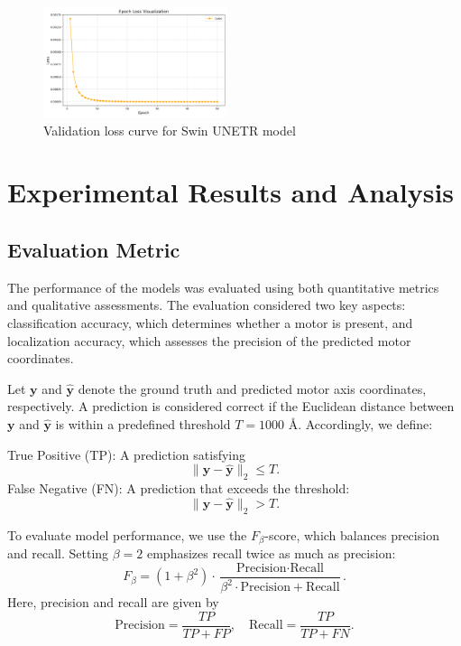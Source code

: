 \documentclass{article}
\begin{document}
\begin{figure}[htb]
    \centering
    \includegraphics[width=0.48\textwidth]{images/unet_val_epoch_loss_visualization.png}
    \caption{Validation loss curve for Swin UNETR model}
    \label{fig:validation_loss}
\end{figure}

\section{Experimental Results and Analysis}  
\label{sec:results}  

\subsection{Evaluation Metric}

The performance of the models was evaluated using both quantitative metrics and qualitative assessments. The evaluation considered two key aspects: classification accuracy, which determines whether a motor is present, and localization accuracy, which assesses the precision of the predicted motor coordinates.  

Let \(\mathbf{y}\) and \(\hat{\mathbf{y}}\) denote the ground truth and predicted motor axis coordinates, respectively. A prediction is considered correct if the Euclidean distance between \(\mathbf{y}\) and \(\hat{\mathbf{y}}\) is within a predefined threshold \(T = 1000\) Å. Accordingly, we define:  

True Positive (TP): A prediction satisfying  \[\|\mathbf{y} - \hat{\mathbf{y}}\|_2 \leq T.\]
False Negative (FN): A prediction that exceeds the threshold:  
  \[
  \|\mathbf{y} - \hat{\mathbf{y}}\|_2 > T.
  \]  

To evaluate model performance, we use the \(F_{\beta}\)-score, which balances precision and recall. Setting \(\beta=2\) emphasizes recall twice as much as precision:  
\begin{equation}
    F_\beta = (1+\beta^2) \cdot \frac{\text{Precision} \cdot \text{Recall}}{\beta^2 \cdot \text{Precision} + \text{Recall}}.
\end{equation}  
Here, precision and recall are given by  
\[
\text{Precision} = \frac{TP}{TP + FP}, \quad  
\text{Recall} = \frac{TP}{TP + FN}.
\]  
\end{document}

